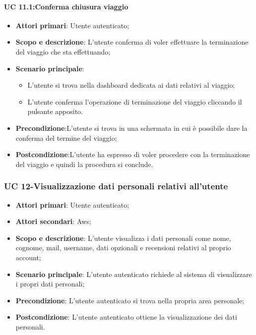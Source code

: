         \paragraph{UC 11.1:Conferma chiusura viaggio}
            \begin{itemize}
                \item \textbf{Attori primari}: Utente autenticato;
                
                \item \textbf{Scopo e descrizione}: L'utente conferma di voler effettuare la terminazione del viaggio che sta effettuando; 
                \item \textbf{Scenario principale}:
                    \begin{itemize}
                        \item L'utente si trova nella dashboard dedicata ai dati relativi al viaggio;
                        \item L'utente conferma l'operazione di terminazione del viaggio cliccando il pulsante apposito.
                    \end{itemize}
                \item \textbf{Precondizione}:L'utente si trova in una schermata in cui è possibile dare la conferma
                del termine del viaggio;
                \item \textbf{Postcondizione}:L’utente ha espresso di voler procedere con la terminazione del viaggio e quindi la procedura si conclude.
            \end{itemize}
        

        
            
       \subsubsection{UC 12-Visualizzazione dati personali relativi all'utente}  
      \begin{itemize}
        \item \textbf{Attori primari}: Utente autenticato;
        \item \textbf{Attori secondari}: Aws;
        \item \textbf{Scopo e descrizione}: L'utente visualizza i dati personali come nome, cognome, mail, username, dati opzionali e recensioni relativi al proprio account; 
        \item \textbf{Scenario principale}: L'utente autenticato richiede al sistema di visualizzare i propri dati personali;
        \item \textbf{Precondizione}: L'utente autenticato si trova nella propria area personale;
        \item \textbf{Postcondizione}: L'utente autenticato ottiene la visualizzazione dei dati personali.
        \end{itemize}  
        
